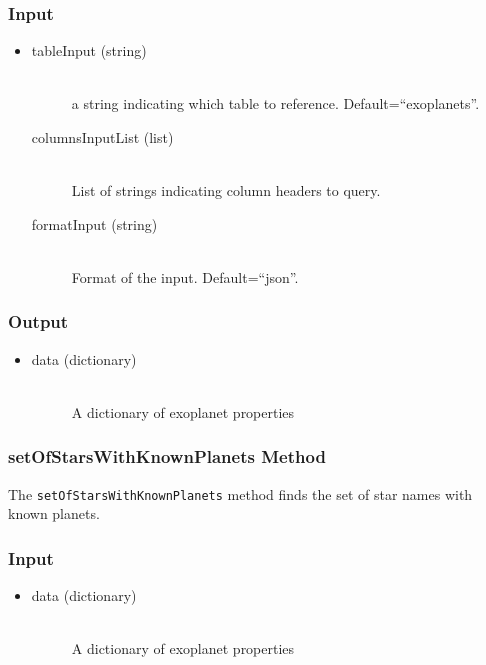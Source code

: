 \documentclass[cleanfoot]{asme2ej}
\begin{document}
\subsubsection*{Input}
\begin{itemize}
\item 
\begin{description}
    \item[tableInput (string)] \hfill \\ a string indicating which table to reference. Default=``exoplanets''.
    \item[columnsInputList (list)] \hfill \\ List of strings indicating column headers to query.
    \item[formatInput (string)] \hfill \\ Format of the input. Default=``json''.
\end{description}
\end{itemize}
\subsubsection*{Output}
\begin{itemize}
\item
\begin{description}
    \item[data (dictionary)] \hfill \\ A dictionary of exoplanet properties
\end{description}
\end{itemize}

\subsubsection{setOfStarsWithKnownPlanets Method} \label{sec:setOfStarsWithKnownPlanetstask}
The \verb+setOfStarsWithKnownPlanets+ method finds the set of star names with known planets.
\subsubsection*{Input}
\begin{itemize}
\item 
\begin{description}
    \item[data (dictionary)] \hfill \\ A dictionary of exoplanet properties
\end{description}
\end{itemize}
\end{document}
